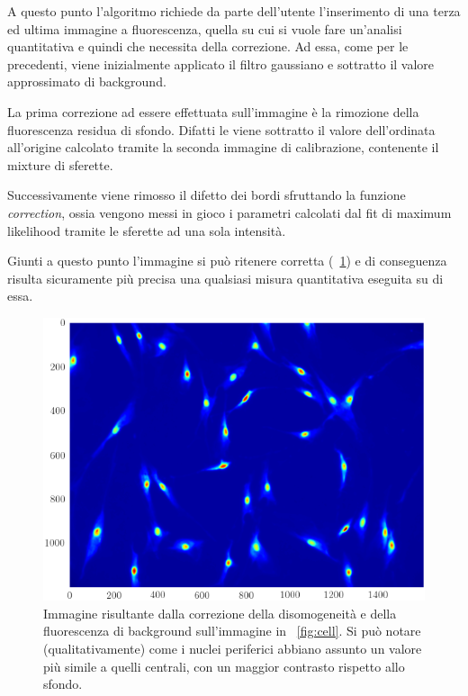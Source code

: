A questo punto l'algoritmo richiede da parte dell'utente l'inserimento di una terza ed ultima immagine a fluorescenza, quella su cui si vuole fare un'analisi quantitativa e quindi che necessita della correzione.
Ad essa, come per le precedenti, viene inizialmente applicato il filtro gaussiano e sottratto il valore approssimato di background.

La prima correzione ad essere effettuata sull'immagine è la rimozione della fluorescenza residua di sfondo. 
Difatti le viene sottratto il valore dell'ordinata all'origine calcolato tramite la seconda immagine di calibrazione, contenente il mixture di sferette.

Successivamente viene rimosso il difetto dei bordi sfruttando la funzione \textit{correction}, ossia vengono messi in gioco i parametri calcolati dal fit di maximum likelihood tramite le sferette ad una sola intensità.

Giunti a questo punto l'immagine si può ritenere corretta (\figurename~\ref{fig:cellcorr}) e di conseguenza risulta sicuramente più precisa una qualsiasi misura quantitativa eseguita su di essa.

\begin{figure}[p]
 \centering
 \includegraphics[scale=.64]{img/CAP3cellcorr.png}
 \caption{\small{Immagine risultante dalla correzione della disomogeneità e della fluorescenza di background sull'immagine in \figurename~\ref{fig:cell}. Si può notare (qualitativamente) come i nuclei periferici abbiano assunto un valore più simile a quelli centrali, con un maggior contrasto rispetto allo sfondo.}}
 \label{fig:cellcorr}
\end{figure}